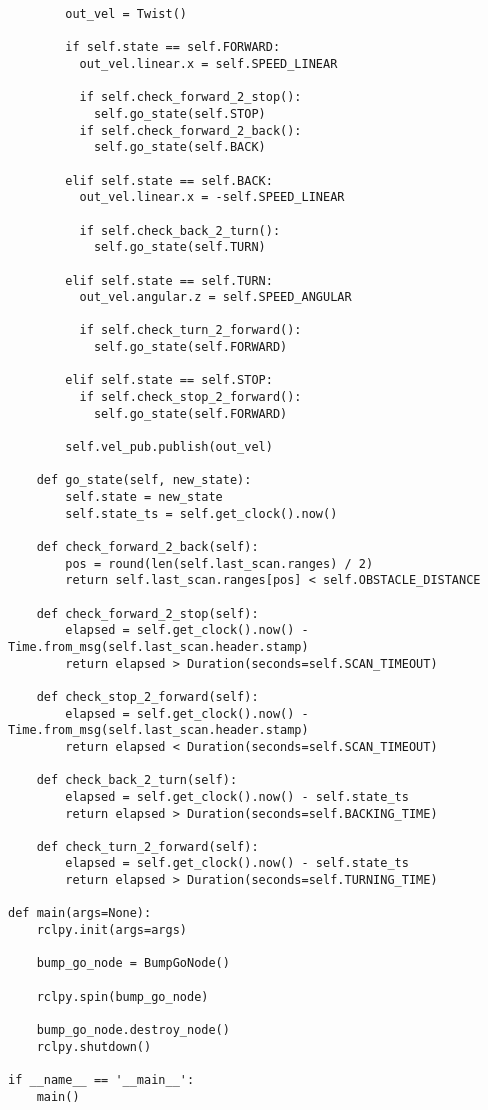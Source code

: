 \begin{tcolorbox}[sharp corners, colframe=gray!80, colback=LightGray, left=0pt, top=0pt, bottom=0pt, title=\texttt{br2\_fsm\_bumpgo\_py/br2\_fsm\_bumpgo\_py/bump\_go\_main.py}]
\begin{verbatim}
        out_vel = Twist()

        if self.state == self.FORWARD: 
          out_vel.linear.x = self.SPEED_LINEAR

          if self.check_forward_2_stop(): 
            self.go_state(self.STOP) 
          if self.check_forward_2_back(): 
            self.go_state(self.BACK)

        elif self.state == self.BACK: 
          out_vel.linear.x = -self.SPEED_LINEAR

          if self.check_back_2_turn(): 
            self.go_state(self.TURN) 

        elif self.state == self.TURN: 
          out_vel.angular.z = self.SPEED_ANGULAR

          if self.check_turn_2_forward(): 
            self.go_state(self.FORWARD)

        elif self.state == self.STOP: 
          if self.check_stop_2_forward(): 
            self.go_state(self.FORWARD)

        self.vel_pub.publish(out_vel) 

    def go_state(self, new_state): 
        self.state = new_state 
        self.state_ts = self.get_clock().now()

    def check_forward_2_back(self): 
        pos = round(len(self.last_scan.ranges) / 2) 
        return self.last_scan.ranges[pos] < self.OBSTACLE_DISTANCE 

    def check_forward_2_stop(self): 
        elapsed = self.get_clock().now() - Time.from_msg(self.last_scan.header.stamp) 
        return elapsed > Duration(seconds=self.SCAN_TIMEOUT) 

    def check_stop_2_forward(self): 
        elapsed = self.get_clock().now() - Time.from_msg(self.last_scan.header.stamp) 
        return elapsed < Duration(seconds=self.SCAN_TIMEOUT) 

    def check_back_2_turn(self): 
        elapsed = self.get_clock().now() - self.state_ts 
        return elapsed > Duration(seconds=self.BACKING_TIME) 

    def check_turn_2_forward(self): 
        elapsed = self.get_clock().now() - self.state_ts 
        return elapsed > Duration(seconds=self.TURNING_TIME) 

def main(args=None): 
    rclpy.init(args=args) 

    bump_go_node = BumpGoNode() 

    rclpy.spin(bump_go_node) 

    bump_go_node.destroy_node() 
    rclpy.shutdown() 

if __name__ == '__main__': 
    main()
    \end{verbatim}
    \end{tcolorbox}
  \normalsize

